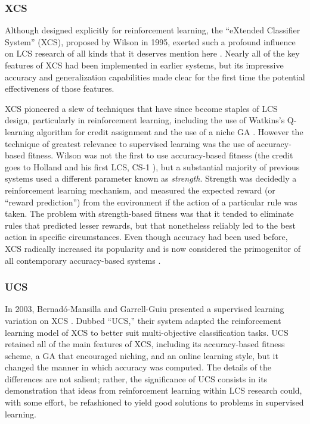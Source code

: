 \documentclass[11pt]{article}
\begin{document}
\subsubsection{XCS}

Although designed explicitly for reinforcement learning, the ``eXtended Classifier System'' (XCS), proposed by Wilson in 1995, exerted such a profound influence on LCS research of all kinds that it deserves mention here \cite{wilson_classifier_1995}. Nearly all of the key features of XCS had been implemented in earlier systems, but its impressive accuracy and generalization capabilities made clear for the first time the potential effectiveness of those features.

XCS pioneered a slew of techniques that have since become staples of LCS design, particularly in reinforcement learning, including the use of Watkins's Q-learning algorithm for credit assignment and the use of a niche GA \cite{urbanowicz_learning_2009}. However the technique of greatest relevance to supervised learning was the use of accuracy-based fitness. Wilson was not the first to use accuracy-based fitness (the credit goes to Holland and his first LCS, CS-1 \cite{holland_cognitive_1977}), but a substantial majority of previous systems used a different parameter known as \emph{strength}. Strength was decidedly a reinforcement learning mechanism, and measured the expected reward (or ``reward prediction'') from the environment if the action of a particular rule was taken. The problem with strength-based fitness was that it tended to eliminate rules that predicted lesser rewards, but that nonetheless reliably led to the best action in specific circumstances. Even though accuracy had been used before, XCS radically increased its popularity and is now considered the primogenitor of all contemporary accuracy-based systems \cite{urbanowicz_learning_2009}.

\subsubsection{UCS}

In 2003, Bernad\'o-Mansilla and Garrell-Guiu presented a supervised learning variation on XCS \cite{bernado-mansilla_accuracy-based_2003}. Dubbed ``UCS,'' their system adapted the reinforcement learning model of XCS to better suit multi-objective classification tasks. UCS retained all of the main features of XCS, including its accuracy-based fitness scheme, a GA that encouraged niching, and an online learning style, but it changed the manner in which accuracy was computed. The details of the differences are not salient; rather, the significance of UCS consists in its demonstration that ideas from reinforcement learning within LCS research could, with some effort, be refashioned to yield good solutions to problems in supervised learning.
\end{document}
